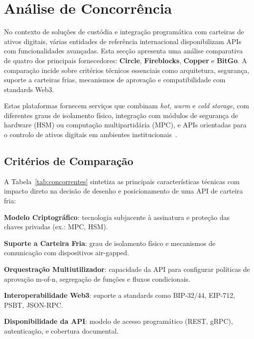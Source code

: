 \newpage
\thispagestyle{otherpages}
\section{Análise de Concorrência}
No contexto de soluções de custódia e integração programática com carteiras de ativos digitais, várias entidades de referência internacional disponibilizam APIs com funcionalidades avançadas. Esta secção apresenta uma análise comparativa de quatro dos principais fornecedores: \textbf{Circle}, \textbf{Fireblocks}, \textbf{Copper} e \textbf{BitGo}. A comparação incide sobre critérios técnicos essenciais como arquitetura, segurança, suporte a carteiras frias, mecanismos de aprovação e compatibilidade com standards Web3.

Estas plataformas fornecem serviços que combinam \textit{hot}, \textit{warm} e \textit{cold storage}, com diferentes graus de isolamento físico, integração com módulos de segurança de hardware (HSM) ou computação multipartidária (MPC), e APIs orientadas para o controlo de ativos digitais em ambientes institucionais~\cite{fireblocks2023,circle2023,copper2023,bitgo2023}.

\subsection{Critérios de Comparação}
A Tabela~\ref{tab:concorrentes} sintetiza as principais características técnicas com impacto direto na decisão de desenho e posicionamento de uma API de carteira fria:

\textbf{Modelo Criptográfico}: tecnologia subjacente à assinatura e proteção das chaves privadas (ex.: MPC, HSM).

\textbf{Suporte a Carteira Fria}: grau de isolamento físico e mecanismos de comunicação com dispositivos air-gapped.

\textbf{Orquestração Multiutilizador}: capacidade da API para configurar políticas de aprovação m-of-n, segregação de funções e fluxos condicionais.

\textbf{Interoperabilidade Web3}: suporte a standards como BIP-32/44, EIP-712, PSBT, JSON-RPC.

\textbf{Disponibilidade da API}: modelo de acesso programático (REST, gRPC), autenticação, e cobertura documental.

